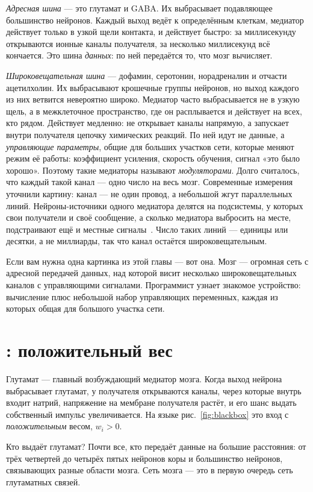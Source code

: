 \emph{Адресная шина} --- это глутамат и GABA. Их выбрасывает подавляющее большинство нейронов. Каждый выход ведёт к определённым клеткам, медиатор действует только в узкой щели контакта, и действует быстро: за миллисекунду открываются ионные каналы получателя, за несколько миллисекунд всё кончается. Это шина \emph{данных}: по ней передаётся то, что мозг вычисляет.

\emph{Широковещательная шина} --- дофамин, серотонин, норадреналин и отчасти ацетилхолин. Их выбрасывают крошечные группы нейронов, но выход каждого из них ветвится невероятно широко. Медиатор часто выбрасывается не в узкую щель, а в межклеточное пространство, где он расплывается и действует на всех, кто рядом. Действует медленно: не открывает каналы напрямую, а запускает внутри получателя цепочку химических реакций. По ней идут не данные, а \emph{управляющие параметры}, общие для больших участков сети, которые меняют режим её работы: коэффициент усиления, скорость обучения, сигнал «это было хорошо». Поэтому такие медиаторы называют \emph{модуляторами}. Долго считалось, что каждый такой канал --- одно число на весь мозг. Современные измерения уточнили картину: канал --- не один провод, а небольшой жгут параллельных линий. Нейроны-источники одного медиатора делятся на подсистемы, у которых свои получатели и своё сообщение, а сколько медиатора выбросить на месте, подстраивают ещё и местные сигналы~\cite{Ren2018,Poe2020}. Число таких линий --- единицы или десятки, а не миллиарды, так что канал остаётся широковещательным.

Если вам нужна одна картинка из этой главы --- вот она. Мозг --- огромная сеть с адресной передачей данных, над которой висит несколько широковещательных каналов с управляющими сигналами. Программист узнает знакомое устройство: вычисление плюс небольшой набор управляющих переменных, каждая из которых общая для большого участка сети.

\section{: положительный вес}

Глутамат --- главный возбуждающий медиатор мозга. Когда выход нейрона выбрасывает глутамат, у получателя открываются каналы, через которые внутрь входит натрий, напряжение на мембране получателя растёт, и его шанс выдать собственный импульс увеличивается. На языке рис.~\ref{fig:blackbox} это вход с \emph{положительным} весом, $w_i>0$.

Кто выдаёт глутамат? Почти все, кто передаёт данные на большие расстояния: от трёх четвертей до четырёх пятых нейронов коры и большинство нейронов, связывающих разные области мозга. Сеть мозга --- это в первую очередь сеть глутаматных связей.

